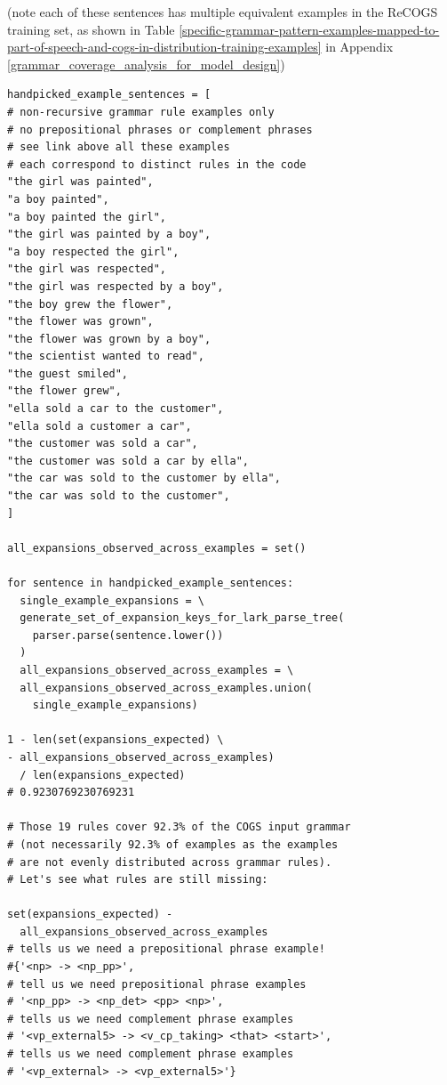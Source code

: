 \documentclass[11pt]{article}
\begin{document}
(note each of these sentences has multiple equivalent examples in the ReCOGS training set, as shown in Table \ref{specific-grammar-pattern-examples-mapped-to-part-of-speech-and-cogs-in-distribution-training-examples} in Appendix \ref{grammar_coverage_analysis_for_model_design})

\begin{tiny}
\begin{verbatim}
handpicked_example_sentences = [ 
# non-recursive grammar rule examples only
# no prepositional phrases or complement phrases
# see link above all these examples 
# each correspond to distinct rules in the code
"the girl was painted",
"a boy painted",
"a boy painted the girl",
"the girl was painted by a boy",
"a boy respected the girl", 
"the girl was respected",
"the girl was respected by a boy",
"the boy grew the flower",
"the flower was grown",
"the flower was grown by a boy",
"the scientist wanted to read",
"the guest smiled",
"the flower grew",
"ella sold a car to the customer",
"ella sold a customer a car",
"the customer was sold a car",
"the customer was sold a car by ella",
"the car was sold to the customer by ella",
"the car was sold to the customer",
]

all_expansions_observed_across_examples = set()

for sentence in handpicked_example_sentences:
  single_example_expansions = \
  generate_set_of_expansion_keys_for_lark_parse_tree(
    parser.parse(sentence.lower())
  )
  all_expansions_observed_across_examples = \
  all_expansions_observed_across_examples.union(
    single_example_expansions)

1 - len(set(expansions_expected) \
- all_expansions_observed_across_examples) 
  / len(expansions_expected)
# 0.9230769230769231

# Those 19 rules cover 92.3% of the COGS input grammar
# (not necessarily 92.3% of examples as the examples 
# are not evenly distributed across grammar rules).
# Let's see what rules are still missing:

set(expansions_expected) - 
  all_expansions_observed_across_examples
# tells us we need a prepositional phrase example!
#{'<np> -> <np_pp>',
# tell us we need prepositional phrase examples
# '<np_pp> -> <np_det> <pp> <np>',
# tells us we need complement phrase examples
# '<vp_external5> -> <v_cp_taking> <that> <start>',
# tells us we need complement phrase examples
# '<vp_external> -> <vp_external5>'}
\end{verbatim}
\end{tiny}
\end{document}
